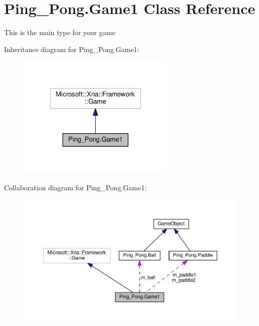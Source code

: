 \hypertarget{class_ping___pong_1_1_game1}{\section{Ping\-\_\-\-Pong.\-Game1 Class Reference}
\label{class_ping___pong_1_1_game1}
}


This is the main type for your game  




Inheritance diagram for Ping\-\_\-\-Pong.\-Game1\-:
\nopagebreak
\begin{figure}[H]
\begin{center}
\leavevmode
\includegraphics[width=214pt]{class_ping___pong_1_1_game1__inherit__graph}
\end{center}
\end{figure}


Collaboration diagram for Ping\-\_\-\-Pong.\-Game1\-:
\nopagebreak
\begin{figure}[H]
\begin{center}
\leavevmode
\includegraphics[width=350pt]{class_ping___pong_1_1_game1__coll__graph}
\end{center}
\end{figure}
